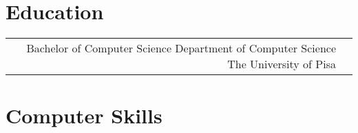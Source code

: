 \documentclass[10pt]{article} %
\begin{document}
\begin{paracol}{2}

\section{Education}





\begin{supertabular}{rl} %


	{Bachelor of Computer Science} %
	{} %
	{Department of Computer Science} %
	{The University of Pisa} %


\end{supertabular}


\section{Computer Skills}






\end{paracol}
\end{document}

